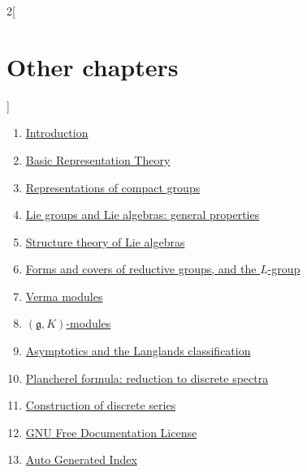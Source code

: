 \begin{multicols}{2}[\section{Other chapters}]
\noindent
\begin{enumerate}
\item \hyperref[introduction-section-phantom]{Introduction}
\item \hyperref[representationtheory-section-phantom]{Basic Representation Theory}
\item \hyperref[representations-compact-section-phantom]{Representations of compact groups}
\item \hyperref[liegroups-general-section-phantom]{Lie groups and Lie algebras: general properties}
\item \hyperref[liestructure-section-phantom]{Structure theory of Lie algebras}
\item \hyperref[reductiveforms-section-phantom]{Forms and covers of reductive groups, and the $L$-group}
\item \hyperref[vermamodules-section-phantom]{Verma modules}
\item \hyperref[gKmodules-section-phantom]{$(\mathfrak g, K)$-modules}
\item \hyperref[asymptotics-section-phantom]{Asymptotics and the Langlands classification}
\item \hyperref[plancherel-section-phantom]{Plancherel formula: reduction to discrete spectra}
\item \hyperref[discreteseries-section-phantom]{Construction of discrete series}
\item \hyperref[fdl-section-phantom]{GNU Free Documentation License}
\item \hyperref[index-section-phantom]{Auto Generated Index}
\end{enumerate}
\end{multicols}


